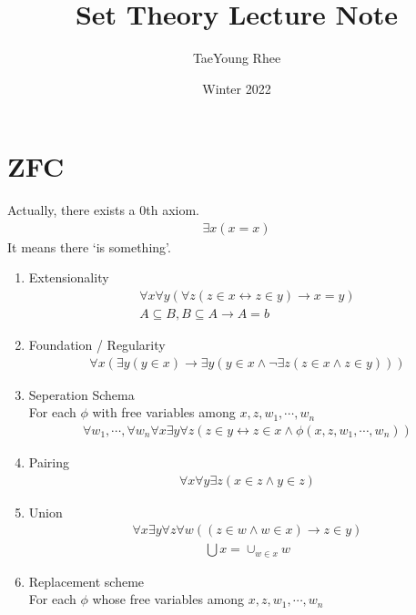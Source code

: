 \documentclass{article}
\title{Set Theory Lecture Note}
\author{TaeYoung Rhee}
\date{Winter 2022}
\theoremstyle{definition}
\begin{document}
\maketitle

\section{ZFC}
Actually, there exists a 0th axiom.
\begin{align*}
    \exists x (x = x )
\end{align*}
It means there `is something'.
\begin{enumerate}
    \item Extensionality
    \begin{align*}
        \forall x \forall y ( \forall z ( z \in x \leftrightarrow z \in y)
        \rightarrow x = y) \\ 
        A \subseteq B , B \subseteq A \rightarrow A = b
    \end{align*}
    \item Foundation / Regularity
    \begin{align*}
        \forall x ( \exists y ( y \in x) \rightarrow \exists y ( y \in x \wedge \neg \exists z
        (z \in x \wedge z \in y)))
    \end{align*}
    \item Seperation Schema \\ 
    For each $\phi$ with free variables among $x, z, w_1, \cdots, w_n$
    \begin{align*}
        \forall w_1, \cdots, \forall w_n \forall x \exists y \forall z
        (z \in y \leftrightarrow z \in x \wedge \phi(x, z, w_1, \cdots, w_n) )
    \end{align*}
    \item Pairing
    \begin{align*}
        \forall x \forall y \exists z ( x \in z \wedge y \in z)
    \end{align*}
    \item Union
    \begin{align*}
        \forall x \exists y \forall z \forall w ((z \in w \wedge w \in x) \rightarrow z \in y)
    \end{align*}
    \begin{align*}
        \bigcup x = \cup_{w\in x} w
    \end{align*}
    \item Replacement scheme \\ 
    For each $\phi$ whose free variables among $x, z, w_1, \cdots, w_n$

\end{enumerate}
\end{document}
